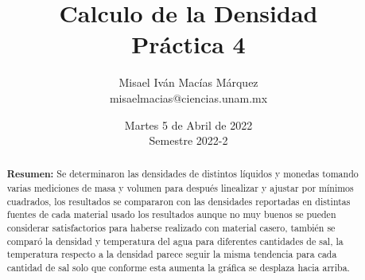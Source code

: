 \documentclass[DIV=calc, paper=a4, fontsize=11pt]{scrartcl}
\title{Calculo de la Densidad\\ %
Práctica 4} %
\author{Misael Iván Macías Márquez\\
misaelmacias@ciencias.unam.mx}
\date{Martes 5 de Abril de 2022\\Semestre 2022-2}
\begin{document}
\maketitle


\begin{abstract}
\textbf{Resumen:} Se determinaron las densidades de distintos líquidos y monedas tomando varias mediciones de masa y volumen para después linealizar y ajustar por mínimos cuadrados, los resultados se compararon con las densidades reportadas en distintas fuentes de cada material usado los resultados aunque no muy buenos se pueden considerar satisfactorios para haberse realizado con material casero, también se comparó la densidad y temperatura del agua para diferentes cantidades de sal, la temperatura respecto a la densidad parece seguir la misma tendencia para cada cantidad de sal solo que conforme esta aumenta la gráfica se desplaza hacia arriba.
\end{abstract}
\end{document}
